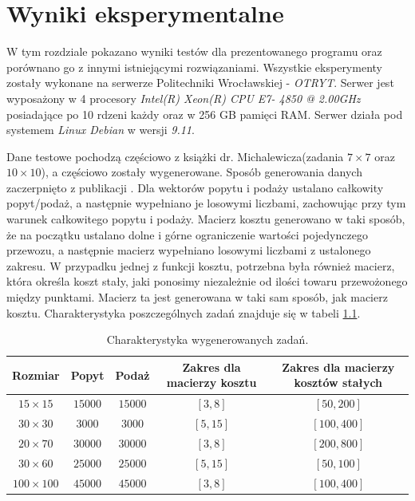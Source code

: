 \chapter{Wyniki eksperymentalne}
\thispagestyle{chapterBeginStyle}

W tym rozdziale pokazano wyniki testów dla prezentowanego programu oraz porównano go z innymi istniejącymi rozwiązaniami. 
Wszystkie eksperymenty zostały wykonane na serwerze Politechniki Wrocławskiej - \textit{OTRYT}. Serwer jest wyposażony w 4 procesory 
\textit{Intel(R) Xeon(R) CPU E7- 4850  @ 2.00GHz} posiadające po 10 rdzeni każdy oraz w 256 GB pamięci RAM. Serwer działa pod systemem 
\textit{Linux Debian} w wersji \textit{9.11}.

Dane testowe pochodzą częściowo z książki dr. Michalewicza(zadania $7 \times 7$ oraz $10 \times 10$)\cite{ALG-GEN-BOOK}, a częściowo 
zostały wygenerowane. Sposób generowania danych zaczerpnięto z publikacji \cite{GEN-TEST-DATA}. Dla wektorów popytu i podaży ustalano 
całkowity popyt/podaż, a następnie wypełniano je losowymi liczbami, zachowując przy tym warunek całkowitego popytu i podaży. 
Macierz kosztu generowano w taki sposób, że na początku ustalano dolne i górne ograniczenie wartości pojedynczego przewozu, a następnie 
macierz wypełniano losowymi liczbami z ustalonego zakresu. W przypadku jednej z funkcji kosztu, potrzebna była również macierz, która 
określa koszt stały, jaki ponosimy niezależnie od ilości towaru przewożonego między punktami. Macierz ta jest generowana w taki sam 
sposób, jak macierz kosztu. Charakterystyka poszczególnych zadań znajduje się w tabeli \ref{specyfika-zadan}.

\begin{table}[H]
    \begin{center}
        \begin{tabular}{c|c|c|c|c}
            Rozmiar & Popyt & Podaż & Zakres dla macierzy kosztu & Zakres dla macierzy kosztów stałych \\ 
            \hline
            $15 \times 15$ & $15000$ & $15000$ & $[3, 8]$ & $[50, 200]$ \\
            $30 \times 30$ & $3000$ & $3000$ & $[5, 15]$ & $[100, 400]$ \\
            $20 \times 70$ & $30000$ & $30000$ & $[3, 8]$ & $[200, 800]$ \\
            $30 \times 60$ & $25000$ & $25000$ & $[5, 15]$ & $[50, 100]$ \\
            $100 \times 100$ & $45000$ & $45000$ & $[3, 8]$ & $[100, 400]$ \\
        \end{tabular}
    \end{center}
    \caption{Charakterystyka wygenerowanych zadań.}
    \label{specyfika-zadan}
\end{table}

